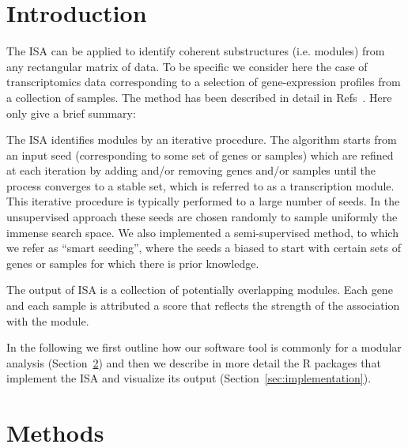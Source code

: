 \documentclass{bioinfo}
\begin{document}
\section{Introduction}

The ISA can be applied to identify coherent substructures (i.e. modules)
from any rectangular matrix of data. To be specific we consider here the
case of transcriptomics data corresponding to a selection of gene-expression
profiles from a collection of samples. The method has been described in
detail in Refs~\cite{BioISA,PREISA}. Here only give a brief summary:

The ISA identifies modules by an iterative procedure. The algorithm starts
from an input seed (corresponding to some set of genes or samples) which are
refined at each iteration by adding and/or removing genes and/or samples
until the process converges to a stable set, which is referred to as a
transcription module. This iterative procedure is typically performed to a
large number of seeds. In the unsupervised approach these seeds are chosen
randomly to sample uniformly the immense search space. We also implemented a
semi-supervised method, to which we refer as ``smart seeding'', where the
seeds a biased to start with certain sets of genes or samples for which
there is prior knowledge.

The output of ISA is a collection of potentially overlapping modules. Each
gene and each sample is attributed a score that reflects the strength of the
association with the module.

In the following we first outline how our software tool is commonly for a
modular analysis (Section~\ref{sec:methods}) and then we describe in more
detail the R packages that implement the ISA and visualize its output
(Section~\ref{sec:implementation}).

\section{Methods}%
\label{sec:methods}
\end{document}
